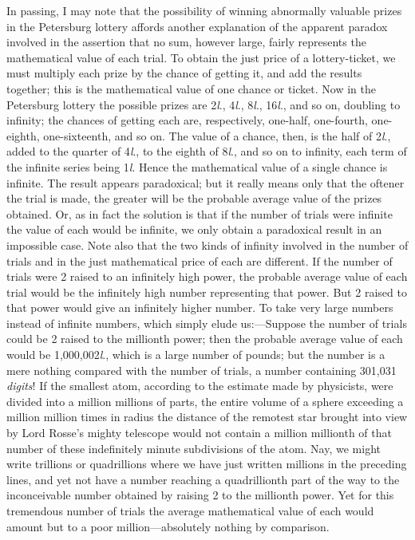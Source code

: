 \documentclass[letterpaper,12pt,oneside,openany]{memoir}
\begin{document}
In passing, I may note that the possibility of winning
abnormally valuable prizes in the Petersburg lottery
affords another explanation of the apparent paradox
involved in the assertion that no sum, however large,
fairly represents the mathematical value of each trial.
To obtain the just price of a lottery-ticket, we must
multiply each prize by the chance of getting it, and add
the results together; this is the mathematical value of
one chance or ticket. Now in the Petersburg lottery
the possible prizes are 2\textit{l}., 4\textit{l}., 8\textit{l}., 16\textit{l}., and so on,
doubling to infinity; the chances of getting each are,
respectively, one-half, one-fourth, one-eighth, one-sixteenth,
and so on. The value of a chance, then, is the
half of 2\textit{l}., added to the quarter of 4\textit{l}., to the eighth of
8\textit{l}., and so on to infinity, each term of the infinite series
being 1\textit{l}. Hence the mathematical value of a single
chance is infinite. The result appears paradoxical; but
it really means only that the oftener the trial is made,
the greater will be the probable average value of the
prizes obtained. Or, as in fact the solution is that if
the number of trials were infinite the value of each
would be infinite, we only obtain a paradoxical result in
an impossible case. Note also that the two kinds of
infinity involved in the number of trials and in the just
mathematical price of each are different. If the number
of trials were 2 raised to an infinitely high power,
the probable average value of each trial would be the
infinitely high number representing that power. But
2 raised to that power would give an infinitely higher
number. To take very large numbers instead of infinite
numbers, which simply elude us:---Suppose the number
of trials could be 2 raised to the millionth power; then
the probable average value of each would be 1,000,002\textit{l}.,
which is a large number of pounds; but the number is a
mere nothing compared with the number of trials, a number
containing 301,031 \emph{digits}! If the smallest atom, according
to the estimate made by physicists, were divided
into a million millions of parts, the entire volume of a
sphere exceeding a million million times in radius the
distance of the remotest star brought into view by Lord
Rosse's mighty telescope would not contain a million
millionth of that number of these indefinitely minute
subdivisions of the atom. Nay, we might write trillions
or quadrillions where we have just written millions in
the preceding lines, and yet not have a number reaching
a quadrillionth part of the way to the inconceivable
number obtained by raising 2 to the millionth power.
Yet for this tremendous number of trials the average
mathematical value of each would amount but to a
poor million---absolutely nothing by comparison.
\end{document}
